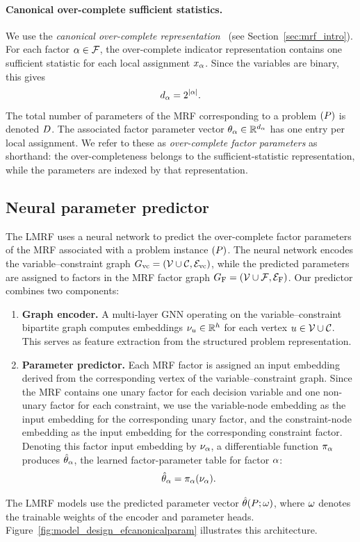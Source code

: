 \paragraph{Canonical over-complete sufficient statistics.} We use the \emph{canonical over-complete representation}~\cite{wainwright_graphical_2007} (see Section~\ref{sec:mrf_intro}). For each factor $\alpha \in \mathcal{F}$, the over-complete indicator representation contains one sufficient statistic for each local assignment $x_{\alpha}$. Since the variables are binary, this gives
\begin{equation*}
    d_{\alpha} = 2^{|\alpha|}.
\end{equation*}
The total number of parameters of the MRF corresponding to a problem $(P)$ is denoted $D$. The associated factor parameter vector
$\theta_{\alpha} \in \mathbb{R}^{d_{\alpha}}$ has one entry per local assignment. We refer to these as \emph{over-complete factor parameters} as shorthand: the over-completeness belongs to the sufficient-statistic representation, while the parameters are indexed by that representation.



\subsection{Neural parameter predictor}
\label{subsec:neural_parameter_predictor}

The LMRF uses a neural network to predict the over-complete factor parameters of the MRF associated with a problem instance $(P)$. The neural network encodes the variable--constraint graph $G_{\mathrm{vc}}=(\mathcal{V} \cup \mathcal{C}, \mathcal{E}_{\mathrm{vc}})$, while the predicted parameters are assigned to factors in the MRF factor graph $G_{\mathrm{F}}=(\mathcal{V} \cup \mathcal{F},\mathcal{E}_{\mathrm{F}})$. Our predictor combines two components:
\begin{enumerate}
    \item \textbf{Graph encoder.} A multi-layer GNN operating on the variable–constraint bipartite graph computes embeddings $\nu_u \in \mathbb{R}^{h}$ for each vertex $u \in \mathcal{V} \cup \mathcal{C}$. This serves as feature extraction from the structured problem representation.
    \item \textbf{Parameter predictor.} Each MRF factor is assigned an input embedding derived from the corresponding vertex of the variable--constraint graph. Since the MRF contains one unary factor for each decision variable and one non-unary factor for each constraint, we use the variable-node embedding as the input embedding for the corresponding unary factor, and the constraint-node embedding as the input embedding for the corresponding constraint factor. Denoting this factor input embedding by $\nu_{\alpha}$, a differentiable function $\pi_{\alpha}$ produces \(\hat{\theta}_{\alpha}\), the learned factor-parameter table for factor \(\alpha\):
\begin{equation*}
\hat{\theta}_{\alpha} = \pi_{\alpha}(\nu_{\alpha}).
\end{equation*}
\end{enumerate}
The LMRF models use the predicted parameter vector $\hat{\theta}(P;\omega)$, where $\omega$ denotes the trainable weights of the encoder and parameter heads. Figure~\ref{fig:model_design_efcanonicalparam} illustrates this architecture.

